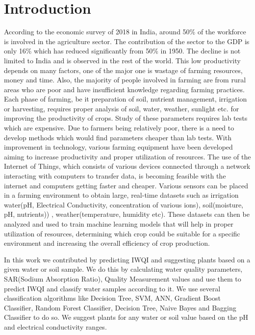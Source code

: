 \section{Introduction}
\label{section:introduction}
According to the economic survey of 2018 in India, around 50\% of the workforce is involved in the agriculture sector\cite{article:indianEconomicSurvey}. The contribution of the sector to the GDP is only 16\% which has reduced significantly from 50\% in 1950. The decline is not limited to India and is observed in the rest of the world. This low productivity depends on many factors, one of the major one is wastage of farming resources, money and time. Also, the majority of people involved in farming are from rural areas who are poor and have insufficient knowledge regarding farming practices. Each phase of farming, be it preparation of soil, nutrient management, irrigation or harvesting, requires proper analysis of soil, water, weather, sunlight etc. for improving the productivity of crops. Study of these parameters requires lab tests which are expensive. Due to farmers being relatively poor, there is a need to develop methods which would find parameters cheaper than lab tests. With improvement in technology, various farming equipment have been developed aiming to increase productivity and proper utilization of resources. The use of the Internet of Things, which consists of various devices connected through a network interacting with computers to transfer data, is becoming feasible with the internet and computers getting faster and cheaper. Various sensors can be placed in a farming environment to obtain large, real-time datasets such as irrigation water(pH, Electrical Conductivity, concentration of various ions), soil(moisture, pH, nutrients)) , weather(temperature, humidity etc). These datasets can then be analyzed and used to train machine learning models that will help in proper utilization of resources, determining which crop could be suitable for a specific environment and increasing the overall efficiency of crop production. 

In this work we contributed by predicting IWQI and suggesting plants based on a given water or soil sample. We do this by calculating water quality parameters, SAR(Sodium Absorption Ratio), Quality Measurement values and use them to predict IWQI and classify water samples according to it. We use several classification algorithms like Decision Tree, SVM, ANN, Gradient Boost Classifier, Random Forest Classifier, Decision Tree, Naive Bayes and Bagging Classifier to do so. We suggest plants for any water or soil value based on the pH and electrical conductivity ranges. 

